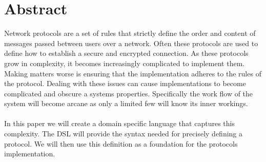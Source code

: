 \section*{Abstract}
Network protocols are a set of rules that strictly define the order and content of messages passed between users over a network. Often these protocols are used to define how to establish a secure and encrypted connection. As these protocols grow in complexity, it becomes increasingly complicated to implement them. Making matters worse is ensuring that the implementation adheres to the rules of the protocol. Dealing with these issues can cause implementations to become complicated and obscure a systems properties. Specifically the work flow of the system will become arcane as only a limited few will know its inner workings.
\\\\
In this paper we will create a domain specific language that captures this complexity. The DSL will provide the syntax needed for precisely defining a protocol. We will then use this definition as a foundation for the protocols implementation.
